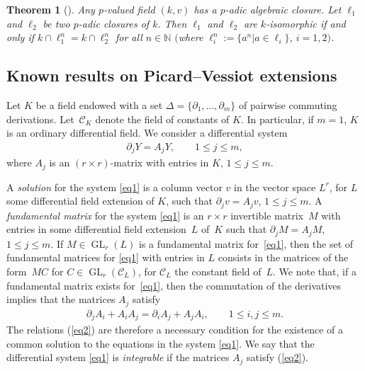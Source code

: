 \documentclass[pdftex]{sigma}%
\numberwithin{equation}{section}
\newtheorem{Theorem}{Theorem}[section]
\newcommand{\N}{\mathbb{N}}
\def \GL{\operatorname{GL}}
\begin{document}
\begin{Theorem}[{\cite[Corollary~3.11]{PR}}] Any $p$-valued field $(k,v)$ has a
$p$-adic algebraic closure. Let $\ell_1$ and $\ell_2$ be two $p$-adic closures of $k$. Then $\ell_1$ and $\ell_2$ are $k$-isomorphic if and only if
$k\cap \ell_1^n=k\cap \ell_2^n$ for all $n \in \N$ $($where $\ell_i^n:=\{a^n| a\in \ell_i\}$, $i=1,2)$.
\end{Theorem}

\subsection{Known results on Picard--Vessiot extensions}

Let $K$ be a field endowed with a set $\Delta=\{\partial_1,\dots,\partial_m \}$ of pairwise commuting derivations. Let~$\mathcal{C}_K$ denote the field of constants of $K$. In particular, if $m=1$, $K$ is an ordinary differential field. We consider a differential system
\begin{gather}\label{eq1}
\partial_j Y=A_j Y, \qquad 1\leq j \leq m,
\end{gather}
where $A_j$ is an $(r \times r)$-matrix with entries in $K$, $1\leq j \leq m$.

A \emph{solution} for the system \eqref{eq1} is a column vector $v$ in the vector space $L^r$, for $L$ some differential field extension of $K$, such that $\partial_j v= A_j v$, $1\leq j \leq m$. A \emph{fundamental matrix} for the system \eqref{eq1} is an $r\times r$ invertible matrix~$M$ with entries in some differential field extension~$L$ of~$K$ such that $\partial_j M= A_j M$, $1\leq j \leq m$. If $M \in \GL_r(L)$ is a fundamental matrix for~\eqref{eq1}, then the set of fundamental matrices for \eqref{eq1} with entries in $L$ consists in the matrices of the form~$MC$ for $C \in \GL_r(\mathcal{C}_L)$, for $\mathcal{C}_L$ the constant field of~$L$. We note that, if a fundamental matrix exists for~\eqref{eq1}, then the commutation of the derivatives implies that the matrices $A_j$ satisfy
\begin{gather}\label{eq2}
\partial_j A_i+A_i A_j=\partial_i A_j + A_j A_i, \qquad
1 \leq i,j\leq m.
\end{gather}
The relations (\ref{eq2}) are therefore a necessary condition for the existence of a common solution to the equations in the system \eqref{eq1}. We say that the differential system \eqref{eq1} is \emph{integrable} if the matrices $A_j$ satisfy (\ref{eq2}).
\end{document}
